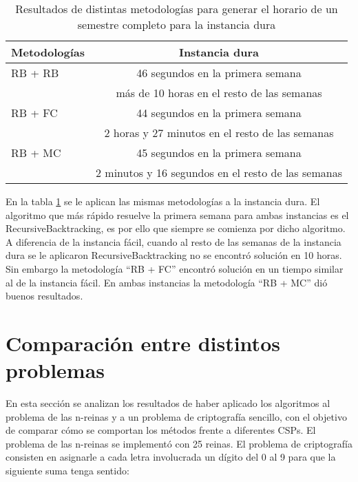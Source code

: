 \begin{table}[h]
	\caption{Resultados de distintas metodolog\'ias para generar el horario de un semestre completo para la instancia dura}
	\begin{center}
		\label{2semestre}
		\begin{tabular}{|l|c||}
			\hline \hline
			Metodolog\'ias & Instancia dura \\ \hline
			RB + RB & 46 segundos en la primera semana \\
			 &  m\'as de 10 horas en el resto de las semanas \\ \hline
			RB + FC & 44 segundos en la primera semana \\
			 & 2 horas y 27 minutos en el resto de las semanas \\ \hline
			RB + MC & 45 segundos en la primera semana \\
			 & 2 minutos y 16 segundos en el resto de las semanas \\ \hline
		\end{tabular}
	\end{center}
\end{table}

En la tabla \ref{2semestre} se le aplican las mismas metodolog\'ias a la instancia dura. El algoritmo que m\'as r\'apido resuelve la primera semana para ambas instancias es el \textsf{RecursiveBacktracking}, es por ello que siempre se comienza por dicho algoritmo. A diferencia de la instancia f\'acil, cuando al resto de las semanas de la instancia dura se le aplicaron \textsf{RecursiveBacktracking} no se encontr\'o soluci\'on en 10 horas. Sin embargo la metodolog\'ia ``RB + FC'' encontr\'o soluci\'on en un tiempo similar al de la instancia f\'acil. En ambas instancias la metodolog\'ia ``RB + MC'' di\'o buenos resultados.

\section{Comparaci\'on entre distintos problemas}

En esta secci\'on se analizan los resultados de haber aplicado los algoritmos al problema de las n-reinas y a un problema de criptograf\'ia sencillo, con el objetivo de comparar c\'omo se comportan los m\'etodos frente a diferentes CSPs. El problema de las n-reinas se implement\'o con 25 reinas. El problema de criptograf\'ia consisten en asignarle a cada letra involucrada un d\'igito del 0 al 9 para que la siguiente suma tenga sentido:

